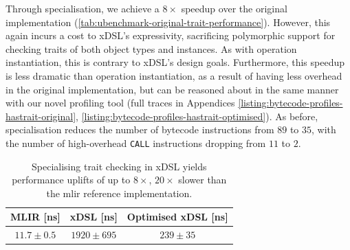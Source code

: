 Through specialisation, we achieve a $8\times$ speedup over the original implementation (\autoref{tab:ubenchmark-original-trait-performance}).
However, this again incurs a cost to xDSL's expressivity, sacrificing polymorphic support for checking traits of both object types and instances. As with operation instantiation, this is contrary to xDSL's design goals.
Furthermore, this speedup is less dramatic than operation instantiation, as a result of having less overhead in the original implementation, but can be reasoned about in the same manner with our novel profiling tool (full traces in Appendices \ref{listing:bytecode-profiles-hastrait-original}, \ref{listing:bytecode-profiles-hastrait-optimised}). As before, specialisation reduces the number of bytecode instructions from $89$ to $35$, with the number of high-overhead \texttt{CALL} instructions dropping from $11$ to $2$.


\begin{table}[H]
  \caption{Specialising trait checking in xDSL yields performance uplifts of up to $8\times$, $20\times$ slower than the \ac{mlir} reference implementation.}
  \label{tab:ubenchmark-original-trait-performance}
  \centering
  \begin{tabular}{ccc}
    \toprule
    \textbf{MLIR [ns]} & \textbf{xDSL [ns]} & \textbf{Optimised xDSL [ns]} \\
    \midrule
    $11.7 \pm 0.5$ & $1920 \pm 695$ & $239 \pm 35$ \\
    \bottomrule
  \end{tabular}
\end{table}







